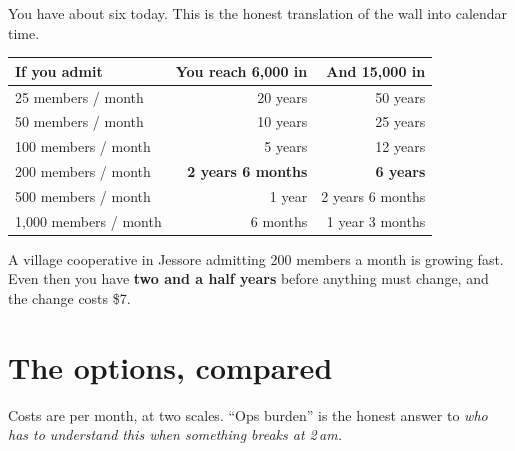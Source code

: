 \documentclass[11pt,a4paper]{article}
\newcommand{\hd}[1]{\textbf{\sffamily\small #1}}
\begin{document}
You have about six today. This is the honest translation of the wall into calendar time.

\begin{center}
\begin{tabular}{@{}lrr@{}}
\toprule
\hd{If you admit} & \hd{You reach 6{,}000 in} & \hd{And 15{,}000 in} \\
\midrule
25 members / month & 20 years & 50 years \\
50 members / month & 10 years & 25 years \\
100 members / month & 5 years & 12 years \\
\rowcolor{greenwash} 200 members / month & \textbf{2 years 6 months} & \textbf{6 years} \\
500 members / month & 1 year & 2 years 6 months \\
1{,}000 members / month & 6 months & 1 year 3 months \\
\bottomrule
\end{tabular}
\end{center}

A village cooperative in Jessore admitting 200 members a month is growing fast. Even then you have \textbf{two and a half years} before anything must change, and the change costs \$7.

\section{The options, compared}

Costs are per month, at two scales. ``Ops burden'' is the honest answer to \emph{who has to understand this when something breaks at 2\,am.}
\end{document}
